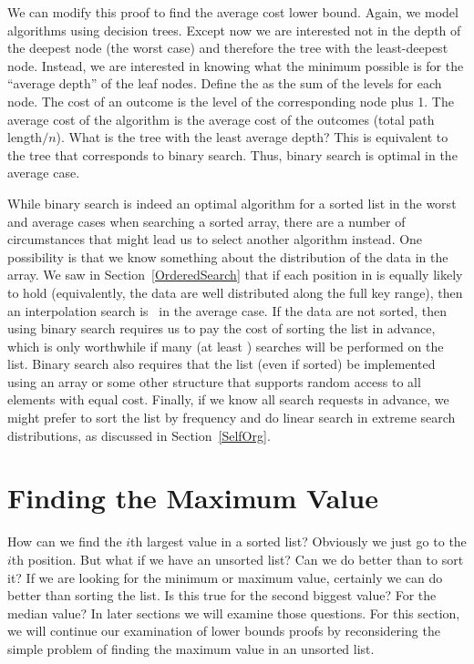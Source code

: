 We can modify this proof to find the average cost lower bound.
Again, we model algorithms using decision trees.
Except now we are interested not in the depth of the deepest node (the
worst case) and therefore the tree with the least-deepest node.
Instead, we are interested in knowing what the minimum possible is for
the ``average depth'' of the leaf nodes.
Define the  as the sum of the levels for each
node.
The cost of an outcome is the level of the corresponding node plus 1.
The average cost of the algorithm is the average cost of the outcomes
(total path length\(/n\)).
What is the tree with the least average depth?
This is equivalent to the tree that corresponds to binary search.
Thus, binary search is optimal in the average case.

While binary search is indeed an optimal algorithm for a sorted list
in the worst and average cases when searching a sorted array, there
are a number of circumstances that might lead us to select another
algorithm instead.
One possibility is that we know something about the distribution of
the data in the array.
We saw in Section~\ref{OrderedSearch} that if each position in 
is equally likely to hold  (equivalently, the data are well
distributed along the full key range), then an interpolation search is
\Thetaloglogn\ in the average case.
If the data are not sorted, then using binary search requires us to
pay the cost of sorting the list in advance, which is only worthwhile
if many (at least \Ologn) searches will be performed on the list.
Binary search also requires that the list (even if sorted) be
implemented using an array or some other structure that supports
random access to all elements with equal cost.
Finally, if we know all search requests in advance, we might prefer to
sort the list by frequency and do linear search in extreme search
distributions, as discussed in Section~\ref{SelfOrg}.


\section{Finding the Maximum Value}
\label{BoundsMax}

How can we find the \(i\)th largest value in a sorted list?
Obviously we just go to the \(i\)th position.
But what if we have an unsorted list?
Can we do better than to sort it?
If we are looking for the minimum or maximum value, certainly we can
do better than sorting the list.
Is this true for the second biggest value?
For the median value?
In later sections we will examine those questions.
For this section, we will continue our examination of lower bounds
proofs by reconsidering the simple problem of finding the maximum
value in an unsorted list.


